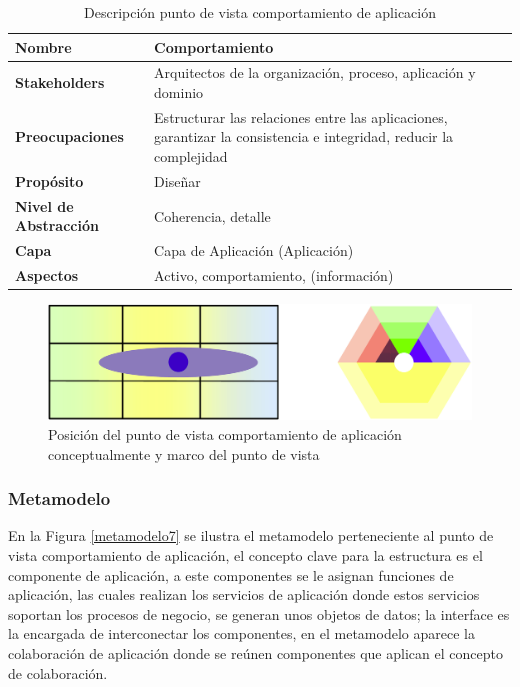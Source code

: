     \begin{table}[h]
    	\centering
    	\begin{tabular}{p{3.7cm}p{8cm}}
    		\hline
\textbf{Nombre} & \textbf{Comportamiento} \\
    		\hline
    		\textbf{Stakeholders} & Arquitectos de la organización, proceso, aplicación y dominio \\
    		\textbf{Preocupaciones} & Estructurar las relaciones entre las aplicaciones, garantizar la consistencia e integridad, reducir la complejidad \\
    		\textbf{Propósito} & Diseñar \\
    		\textbf{Nivel de Abstracción} & Coherencia, detalle \\
    		\textbf{Capa} & Capa de Aplicación (Aplicación) \\
    		\textbf{Aspectos} & Activo, comportamiento, (información) \\
    	\end{tabular}
    	\caption{Descripción punto de vista comportamiento de aplicación \cite{ref9}}
    	\label{tabla10}
    \end{table}
    
    \begin{figure}[h]
    	\centering
    	\includegraphics[scale=0.2]{Imagenes/Figuras/20}
    	\caption{Posición del punto de vista comportamiento de aplicación conceptualmente y marco del punto de vista \cite{ref9}}
    	\label{figura20}
    \end{figure}
    
    \subsubsection{Metamodelo}
    En la Figura \ref{metamodelo7} se ilustra el metamodelo perteneciente al punto de vista comportamiento de aplicación, el concepto clave para la estructura es el componente de aplicación, a este componentes se le asignan funciones de aplicación, las cuales realizan los servicios de aplicación donde estos servicios soportan los procesos de negocio, se generan unos objetos de datos; la interface es la encargada de interconectar los componentes, en el metamodelo aparece la colaboración de aplicación donde se reúnen componentes que aplican el concepto de colaboración. \cite{ref9}
    
